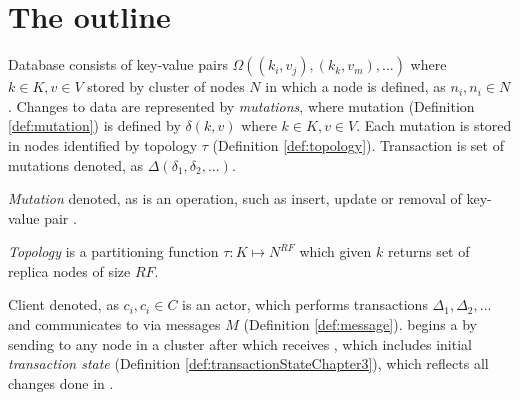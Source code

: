 

\section{The outline}
Database consists of key-value pairs $\Omega((k_{i},v_{j}), (k_{k},v_{m}),...)$ where $k\in\mathit{K}, v\in\mathit{V}$ stored by cluster of nodes $\mathit{N}$ in which a node is defined, as $n_{i}, n_{i}\in\mathit{N}$.
Changes to data are represented by \emph{mutations}, where mutation (Definition \ref{def:mutation}) is defined by $\delta(k,v)$ where $k \in \mathit{K}, v \in \mathit{V}$. 
Each mutation is stored in nodes identified by topology $\tau$ (Definition \ref{def:topology}).
Transaction is set of mutations denoted, as $\Delta(\delta_{1}, \delta_{2}, ...)$.

\begin{definition}
  \label{def:mutation}
  \emph{Mutation} denoted, as  is an operation, such as insert, update or removal of key-value pair \kv. 
\end{definition}

\begin{definition}
\label{def:topology}
\emph{Topology} is a partitioning function $\tau:\mathit{K} \mapsto \mathit{N^{RF}}$ which given $k$ returns set of replica nodes of size $\mathit{RF}$. 
\end{definition}


Client denoted, as $c_{i}, c_{i}\in\mathit{C}$ is an actor, which performs transactions $\Delta_{1}, \Delta_{2}, ...$ and communicates to \nodes via messages $\mathit{M}$ (Definition \ref{def:message}). \client begins a \transaction by sending \beginTransactionMessage to any node in a cluster after which \client receives 
\initialTxStateMessage, which includes 
initial \emph{transaction state} (Definition \ref{def:transactionStateChapter3}), which reflects all changes done in \transaction.

